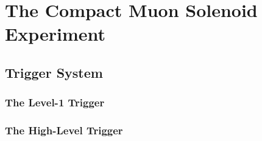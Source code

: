 \chapter{The Compact Muon Solenoid Experiment}\label{ch:cms}

\section{Trigger System}\label{sec:trigger}

\subsection{The Level-1 Trigger}\label{subsec:L1_trig}

\subsection{The High-Level Trigger}\label{subsec:hlt}